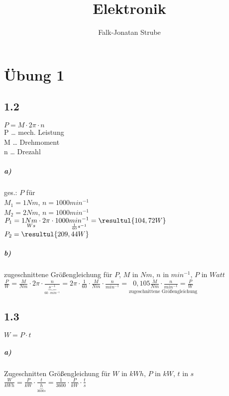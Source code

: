 \documentclass{scrreprt}
\title{Elektronik}
\author{Falk-Jonatan Strube}
\begin{document}
\maketitle
\tableofcontents

\chapter{Übung 1}

\section*{1.2}

$\boxed{P=M\cdot 2\pi \cdot n}$\\
P … mech. Leistung\\
M … Drehmoment\\
n … Drezahl
\paragraph{a)} ges.: $P$ für\\
$M_1= 1Nm$, $n=1000 min^{-1}$\\
$M_2= 2Nm$, $n=1000 min^{-1}$\vspace*{1em}\\
$P_1=1\underset{Ws}{Nm} \cdot 2\pi \cdot 1000 \underset{\frac{1}{60}s^{-1}}{min^{-1}}=\resultul{104,72W}$\\
$P_2=\resultul{209,44W}$

\paragraph{b)} zugeschnittene Größengleichung für $P$, $M$ in $Nm$, $n$ in $min^{-1}$, $P$ in $Watt$\\
$\frac{P}{W}=\frac{M}{Nm} \cdot 2 \pi \cdot \frac{n}{\underbrace{s^{-1}}_{60\cdot min^{-1}}}=2\pi \cdot \frac{1}{60} \cdot \frac{M}{Nm} \cdot \frac{n}{min^{-1}}=\underset{\text{zugeschnittene Größengleichung}}{\boxed{0,105\frac{M}{Nm}\cdot \frac{n}{min^{-1}}=\frac{P}{W}}}$

\section*{1.3}
$\boxed{W=P\cdot t}$
\paragraph{a)} Zugeschnitten Größengleichung für $W$ in $kWh$, $P$ in $kW$, $t$ in $s$\\
$\frac{W}{kWh}=\frac{P}{kW}\cdot \frac{t}{\underbrace{h}_{3600s}}=\frac{1}{3600}\cdot \frac{P}{kW} \cdot \frac{t}{s}$
\end{document}

